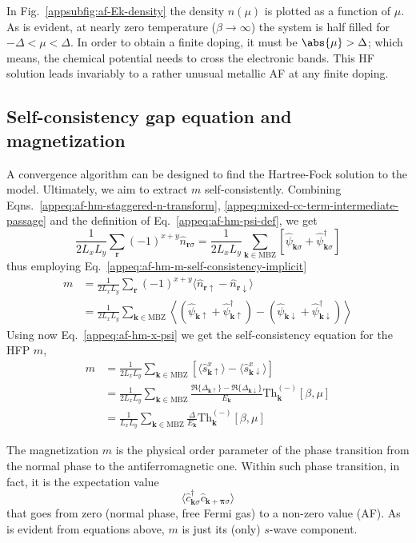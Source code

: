 {In Fig.~\ref{appsubfig:af-Ek-density} the density $n(\mu)$ is plotted as a function of $\mu$. As is evident, at nearly zero temperature ($\beta\to\infty$) the system is half filled for $-\Delta<\mu<\Delta$. In order to obtain a finite doping, it must be $\abs{\mu}>\Delta$; which means, the chemical potential needs to cross the electronic bands. This HF solution leads invariably to a rather unusual metallic AF at any finite doping.
}
\subsection{Self-consistency gap equation and magnetization}\label{appsubsec:af-self-consistency-gap-equation}

{\color{tabred}
A convergence algorithm can be designed to find the Hartree-Fock solution to the model. Ultimately, we aim to extract $m$ self-consistently. Combining Eqns.~\eqref{appeq:af-hm-staggered-n-transform}, \eqref{appeq:mixed-cc-term-intermediate-passage} and the definition of Eq.~\eqref{appeq:af-hm-psi-def}, we get
\[
	\frac{1}{2L_xL_y} \sum_\mathbf{r} (-1)^{x+y} \hat n_{\mathbf{r}\sigma} = \frac{1}{2L_xL_y} \sum_{\mathbf{k}\in\mathrm{MBZ}} \left[
		\hat \psi_{\mathbf{k}\sigma} + \hat \psi_{\mathbf{k}\sigma}^\dagger
	\right]
\]
thus employing Eq.~\eqref{appeq:af-hm-m-self-consistency-implicit}
\[
\begin{aligned}
	m &= \frac{1}{2L_xL_y} \sum_\mathbf{r} (-1)^{x+y} \langle
		\hat n_{\mathbf{r}\uparrow} - \hat n_{\mathbf{r}\downarrow}
	\rangle \\
	&= \frac{1}{2L_xL_y} \sum_{\mathbf{k} \in \mathrm{MBZ}} \left\langle
		\left(\hat \psi_{\mathbf{k}\uparrow} + \hat \psi_{\mathbf{k}\uparrow}^\dagger\right) - \left(\hat \psi_{\mathbf{k}\downarrow} + \hat \psi_{\mathbf{k}\downarrow}^\dagger\right)
	\right\rangle
\end{aligned}
\]
Using now Eq.~\eqref{appeq:af-hm-x-psi} we get the self-consistency equation for the HFP $m$,
\begin{align}
	m &= \frac{1}{2L_xL_y} \sum_{\mathbf{k} \in \mathrm{MBZ}} \left[
		\langle
			\hat s_{\mathbf{k}\uparrow}^x
		\rangle
		 - 
		 \langle
			 \hat s_{\mathbf{k}\downarrow}^x
		 \rangle
	\right] \nonumber \\
	&= \frac{1}{2L_xL_y} \sum_{\mathbf{k} \in \mathrm{MBZ}} \frac{\Re\lbrace\Delta_{\mathbf{k}\uparrow}\rbrace-\Re\lbrace\Delta_{\mathbf{k}\downarrow}\rbrace}{E_\mathbf{k}} \mathrm{Th}_\mathbf{k}^{(-)}[\beta,\mu] \nonumber \\
	&= \frac{1}{L_x L_y} \sum_{\mathbf{k} \in \mathrm{MBZ}} \frac{\Delta}{E_\mathbf{k}} \mathrm{Th}_\mathbf{k}^{(-)}[\beta,\mu] \label{appeq:af-hm-m-self-consistency}
\end{align}

The magnetization $m$ is the physical order parameter of the phase transition from the normal phase to the antiferromagnetic one. Within such phase transition, in fact, it is the expectation value
\[
	\langle
		\hat c_{\mathbf{k}\sigma}^\dagger \hat 	c_{\mathbf{k}+\bm{\pi}\sigma} 
	\rangle
\]
that goes from zero (normal phase, free Fermi gas) to a non-zero value (AF). As is evident from equations above, $m$ is just its (only) $s$-wave component.
}
